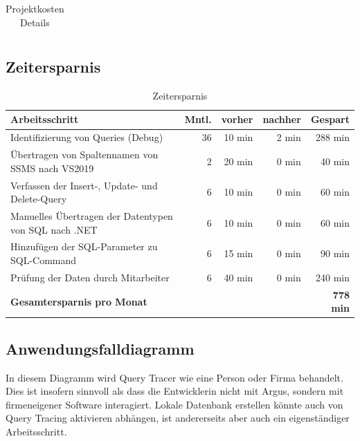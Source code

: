\documentclass[11pt,toc=sectionentrywithoutdots, 
headheight=44pt, headings=optiontoheadandtoc, hyperfootnotes=false, hypertexnames=false]{scrartcl}
\begin{document}
\begin{center}
\begin{table}[ht]
\begin{tabular}{|| p{27mm} | p{23mm} | r | r | r | r | r ||}
			\end{tabular}
			\caption{Projektkosten Details}
			\end{table}
			\end{center}
			
				
			
	
	
		
		

\subsection{Zeitersparnis}
	\label{sec:Zeitersparnis}
\begin{table}[ht]
\centering
		\begin{tabular}{|| l | r | r | r | r ||}
	    \hline
	    
		\textbf{Arbeitsschritt}                                     & \textbf{Mntl.} &\textbf{vorher} & \textbf{nachher} &\textbf{Gespart}\\
		\hline
		Identifizierung von Queries (Debug)                         & 36        & 10 min         & 2 min	         & 288 min\\
		Übertragen von Spaltennamen von SSMS nach VS2019            & 2         & 20 min         & 0 min	         & 40 min\\
		Verfassen der Insert-, Update- und Delete-Query             & 6         & 10 min         & 0 min	         & 60 min\\
		Manuelles Übertragen der Datentypen von SQL nach .NET       & 6         & 10 min         & 0 min	         & 60 min\\
		Hinzufügen der SQL-Parameter zu SQL-Command                 & 6         & 15 min         & 0 min	         & 90 min\\
		Prüfung der Daten durch Mitarbeiter                         & 6         & 40 min         & 0 min	         & 240 min\\
		\hline		
		\multicolumn{4}{||l|}{\textbf{Gesamtersparnis pro Monat}}                                                &\textbf{778 min}\\
		\hline
		
		
			\end{tabular}
			\caption{Zeitersparnis}
			\end{table}
			

\clearpage
\subsection{Anwendungsfalldiagramm}
In diesem Diagramm wird \glqq Query Tracer\grqq{} wie eine Person oder Firma behandelt. Dies ist insofern sinnvoll als dass die Entwicklerin nicht mit Argus, sondern mit firmeneigener Software interagiert. \glqq Lokale Datenbank erstellen\grqq{} könnte auch von \glqq Query Tracing aktivieren\grqq{} abhängen, ist andererseits aber auch ein eigenständiger Arbeitsschritt.
 \label{fig:Anwendungsfalldiagramm}
\end{document}
